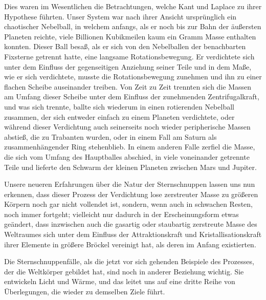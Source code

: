 \documentclass[a4paper, 11pt, oneside, german]{article}
\begin{document}
Dies waren im Wesentlichen die Betrachtungen, welche Kant und Laplace zu ihrer Hypothese führten. Unser System war nach ihrer Ansicht ursprünglich ein chaotischer Nebelball, in welchem anfangs, als er noch bis zur Bahn der äußersten Planeten reichte, viele Billionen Kubikmeilen kaum ein Gramm Masse enthalten konnten. Dieser Ball besaß, als er sich von den Nebelballen der benachbarten Fixsterne getrennt hatte, eine langsame Rotationsbewegung. Er verdichtete sich unter dem Einfluss der gegenseitigen Anziehung seiner Teile und in dem Maße, wie er sich verdichtete, musste die Rotationsbewegung zunehmen und ihn zu einer flachen Scheibe auseinander treiben. Von Zeit zu Zeit trennten sich die Massen am Umfang dieser Scheibe unter dem Einfluss der zunehmenden Zentrifugalkraft, und was sich trennte, ballte sich wiederum in einen rotierenden Nebelball zusammen, der sich entweder einfach zu einem Planeten verdichtete, oder während dieser Verdichtung auch seinerseits noch wieder peripherische Massen abstieß, die zu Trabanten wurden, oder in einem Fall am Saturn als zusammenhängender Ring stehenblieb. In einem anderen Falle zerfiel die Masse, die sich vom Umfang des Hauptballes abschied, in viele voneinander getrennte Teile und lieferte den Schwarm der kleinen Planeten zwischen Mars und Jupiter.

Unsere neueren Erfahrungen über die Natur der Sternschnuppen lassen uns nun erkennen, dass dieser Prozess der Verdichtung lose zerstreuter Masse zu größeren Körpern noch gar nicht vollendet ist, sondern, wenn auch in schwachen Resten, noch immer fortgeht; vielleicht nur dadurch in der Erscheinungsform etwas geändert, dass inzwischen auch die gasartig oder staubartig zerstreute Masse des Weltraumes sich unter dem Einfluss der Attraktionskraft und Kristallisationskraft ihrer Elemente in größere Bröckel vereinigt hat, als deren im Anfang existierten.

Die Sternschnuppenfälle, als die jetzt vor sich gehenden Beispiele des Prozesses, der die Weltkörper gebildet hat, sind noch in anderer Beziehung wichtig. Sie entwickeln Licht und Wärme, und das leitet uns auf eine dritte Reihe von Überlegungen, die wieder zu demselben Ziele führt.
\end{document}
